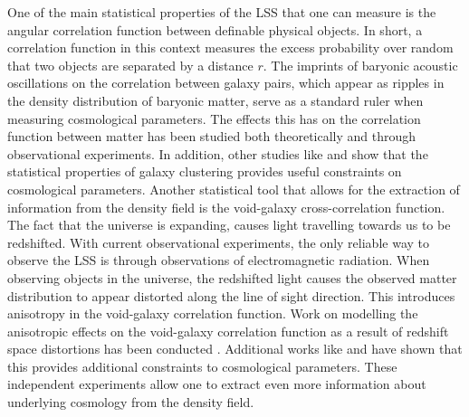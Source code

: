 One of the main statistical properties of the LSS that one can measure is the angular correlation function between definable physical objects. In short, a correlation function in this context measures the excess probability over random that two objects are separated by a distance $r$. The imprints of baryonic acoustic oscillations on the correlation between galaxy pairs\cite{pe00300h}, which appear as ripples in the density distribution of baryonic matter, serve as a standard ruler when measuring cosmological parameters. The effects this has on the correlation function between matter has been studied both theoretically\cite{peebles1980} and through observational experiments\cite{Eisenstein_2005}. In addition, other studies like \cite{refId0} and \cite{Bautista_2020} show that the statistical properties of galaxy clustering provides useful constraints on cosmological parameters. Another statistical tool that allows for the extraction of information from the density field is the void-galaxy cross-correlation function. The fact that the universe is expanding\cite{Hubble168}, causes light travelling towards us to be redshifted. With current observational experiments, the only reliable way to observe the LSS is through observations of electromagnetic radiation. When observing objects in the universe, the redshifted light causes the observed matter distribution to appear distorted along the line of sight direction. This introduces anisotropy in the void-galaxy correlation function. Work on modelling the anisotropic effects on the void-galaxy correlation function as a result of redshift space distortions has been conducted \cite{Nadathur_corr}. Additional works like \cite{BeyondBAO} and \cite{Nadathur_2020} have shown that this provides additional constraints to cosmological parameters. These independent experiments allow one to extract even more information about underlying cosmology from the density field.\\\indent

